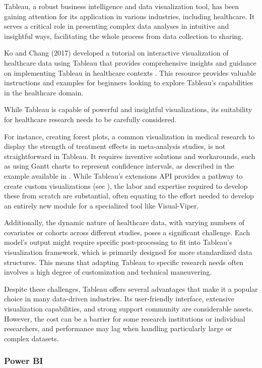Tableau, a robust business intelligence and data visualization tool, has been gaining attention for its application in various industries, including healthcare. It serves a critical role in presenting complex data analyses in intuitive and insightful ways, facilitating the whole process from data collection to sharing.

Ko and Chang (2017) developed a tutorial on interactive visualization of healthcare data using Tableau that provides comprehensive insights and guidance on implementing Tableau in healthcare contexts \cite{soa26}. This resource provides valuable instructions and examples for beginners looking to explore Tableau's capabilities in the healthcare domain.

While Tableau is capable of powerful and insightful visualizations, its suitability for healthcare research needs to be carefully considered.

For instance, creating forest plots, a common visualization in medical research to display the strength of treatment effects in meta-analysis studies, is not straightforward in Tableau. It requires inventive solutions and workarounds, such as using Gantt charts to represent confidence intervals, as described in the example available in \cite{soa24}. While Tableau's extensions API provides a pathway to create custom visualizations (see \cite{soa25}), the labor and expertise required to develop these from scratch are substantial, often equating to the effort needed to develop an entirely new module for a specialized tool like Visual-Viper.

Additionally, the dynamic nature of healthcare data, with varying numbers of covariates or cohorts across different studies, poses a significant challenge. Each model's output might require specific post-processing to fit into Tableau's visualization framework, which is primarily designed for more standardized data structures. This means that adapting Tableau to specific research needs often involves a high degree of customization and technical maneuvering.

Despite these challenges, Tableau offers several advantages that make it a popular choice in many data-driven industries. Its user-friendly interface, extensive visualization capabilities, and strong support community are considerable assets. However, the cost can be a barrier for some research institutions or individual researchers, and performance may lag when handling particularly large or complex datasets.

\subsubsection{Power BI}\label{power-bi}


